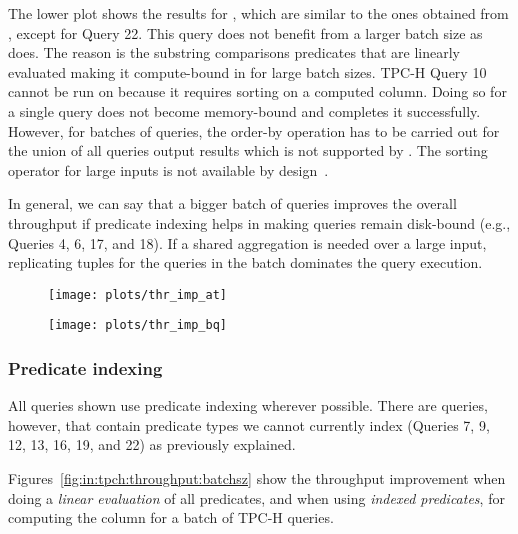 The lower plot shows the results for \bigquery,
which are similar to the ones obtained from \athena, except for Query 22.  This
query does not benefit from a larger batch size as \athena does. The reason is
the substring comparisons predicates that are linearly evaluated making it
compute-bound in \bigquery for large batch sizes.  TPC-H Query 10 cannot be run
on \bigquery because it requires sorting on a computed column. Doing so for a
single query does not become memory-bound and \bigquery completes it
successfully.  However, for batches of queries, the order-by operation has to be
carried out for the union of all queries output results which is not
supported by \bigquery.  The sorting operator for large inputs is not available
by design~\cite{resources_exceeded_bq}. 

In general, we can say that a bigger batch of queries improves the overall
throughput if predicate indexing helps in making queries remain disk-bound
(e.g., Queries 4, 6, 17, and 18). If a shared aggregation is needed over a
large input, replicating tuples for the queries in the batch dominates the query
execution.

\begin{figure*}[tb]
    \centering
    \begin{subfigure}[b]{\textwidth}
        \texttt{[image: plots/thr\_imp\_at]}
        \centering
        \caption{\athena}
        \label{fig:in:tpch:throughput:batchsz:at}
    \end{subfigure}
    \begin{subfigure}[b]{\textwidth}
        \texttt{[image: plots/thr\_imp\_bq]}
        \centering
        \caption{\bigquery}
        \label{fig:in:tpch:throughput:batchsz:bq}
    \end{subfigure}
    \caption{TPC-H throughput improvement of shared execution over query-at-a-time.}
    \label{fig:in:tpch:throughput:batchsz}
\end{figure*}

\subsubsection{Predicate indexing}
\label{sec:exp:tpch:pred_idx}

All queries shown use predicate indexing wherever possible. There are queries,
however, that contain predicate types we cannot currently index  (Queries 7, 9,
12, 13, 16, 19, and 22) as previously explained.

Figures~\ref{fig:in:tpch:throughput:batchsz} show the throughput improvement
when doing a \textit{linear evaluation} of all predicates, and when using
\textit{indexed predicates}, for computing the \qset column for a batch of
TPC-H queries.

